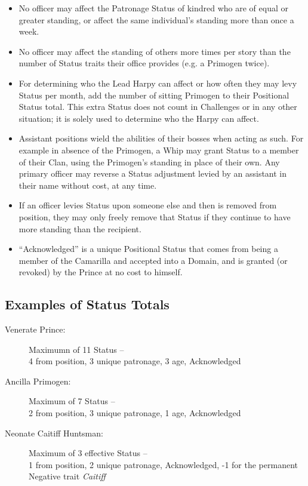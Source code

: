 \begin{itemize}
   \item No officer may affect the Patronage Status of kindred who are of equal or greater 
   standing, or affect the same individual's standing more than once a week.
   \item No officer may affect the standing of others more times per story than the 
   number of Status traits their office provides (e.g. a Primogen twice).
   \item For determining who the Lead Harpy can affect or how often they may levy Status 
   per month, add the number of sitting Primogen to their Positional Status total.  This extra 
   Status does not count in Challenges or in any other situation; it is solely used to determine 
   who the Harpy can affect.
   \item Assistant positions wield the abilities of their bosses when acting as such.  For 
   example in absence of the Primogen, a Whip may grant Status to a member of their Clan, using 
   the Primogen's standing in place of their own. Any primary officer may reverse a Status adjustment 
   levied by an assistant in their name without cost, at any time.
   \item If an officer levies Status upon someone else and then is removed from position, they may 
   only freely remove that Status if they continue to have more standing than the recipient.
   \item ``Acknowledged'' is a unique Positional Status that comes from being a member of the 
   Camarilla and accepted into a Domain, and is granted (or revoked) by the Prince at no cost to himself.
\end{itemize}

\subsection{Examples of Status Totals}
\begin{description}
	\item[Venerate Prince:]  Maximumn of 11 Status -- \\ 
	4 from position, 3 unique patronage, 3 age, Acknowledged
	\item[Ancilla Primogen:]  Maximum of 7 Status --  \\ 
	2 from position, 3 unique patronage, 1 age, Acknowledged
	\item[Neonate Caitiff Huntsman:]  Maximum of 3 effective Status -- \\ 
	1 from position, 2 unique patronage, Acknowledged, -1 for the permanent Negative trait \emph{Caitiff}
\end{description}

